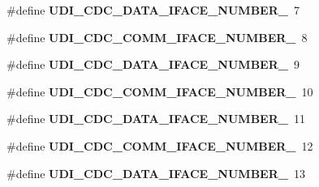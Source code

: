\begin{DoxyCompactItemize}
\item 
\hypertarget{group__udi__cdc__group__single__desc_ga025950aeedd93d7d00cc1754be5cf183}{\#define {\bfseries U\-D\-I\-\_\-\-C\-D\-C\-\_\-\-D\-A\-T\-A\-\_\-\-I\-F\-A\-C\-E\-\_\-\-N\-U\-M\-B\-E\-R\-\_}~7}\label{group__udi__cdc__group__single__desc_ga025950aeedd93d7d00cc1754be5cf183}

\item 
\hypertarget{group__udi__cdc__group__single__desc_ga8e135589db6eac98726ce02518bd2340}{\#define {\bfseries U\-D\-I\-\_\-\-C\-D\-C\-\_\-\-C\-O\-M\-M\-\_\-\-I\-F\-A\-C\-E\-\_\-\-N\-U\-M\-B\-E\-R\-\_}~8}\label{group__udi__cdc__group__single__desc_ga8e135589db6eac98726ce02518bd2340}

\item 
\hypertarget{group__udi__cdc__group__single__desc_ga0c3771d822965dddc9eef292f39ff347}{\#define {\bfseries U\-D\-I\-\_\-\-C\-D\-C\-\_\-\-D\-A\-T\-A\-\_\-\-I\-F\-A\-C\-E\-\_\-\-N\-U\-M\-B\-E\-R\-\_}~9}\label{group__udi__cdc__group__single__desc_ga0c3771d822965dddc9eef292f39ff347}

\item 
\hypertarget{group__udi__cdc__group__single__desc_ga040c811af32af103f96af72f55922259}{\#define {\bfseries U\-D\-I\-\_\-\-C\-D\-C\-\_\-\-C\-O\-M\-M\-\_\-\-I\-F\-A\-C\-E\-\_\-\-N\-U\-M\-B\-E\-R\-\_}~10}\label{group__udi__cdc__group__single__desc_ga040c811af32af103f96af72f55922259}

\item 
\hypertarget{group__udi__cdc__group__single__desc_gac99be51d82291d00c0188a6d05a6cc02}{\#define {\bfseries U\-D\-I\-\_\-\-C\-D\-C\-\_\-\-D\-A\-T\-A\-\_\-\-I\-F\-A\-C\-E\-\_\-\-N\-U\-M\-B\-E\-R\-\_}~11}\label{group__udi__cdc__group__single__desc_gac99be51d82291d00c0188a6d05a6cc02}

\item 
\hypertarget{group__udi__cdc__group__single__desc_ga7a7487e51450e9923a2ea3bf884a3039}{\#define {\bfseries U\-D\-I\-\_\-\-C\-D\-C\-\_\-\-C\-O\-M\-M\-\_\-\-I\-F\-A\-C\-E\-\_\-\-N\-U\-M\-B\-E\-R\-\_}~12}\label{group__udi__cdc__group__single__desc_ga7a7487e51450e9923a2ea3bf884a3039}

\item 
\hypertarget{group__udi__cdc__group__single__desc_ga0d859a246f282ed4f61692066d9a9a9d}{\#define {\bfseries U\-D\-I\-\_\-\-C\-D\-C\-\_\-\-D\-A\-T\-A\-\_\-\-I\-F\-A\-C\-E\-\_\-\-N\-U\-M\-B\-E\-R\-\_}~13}\label{group__udi__cdc__group__single__desc_ga0d859a246f282ed4f61692066d9a9a9d}

\end{DoxyCompactItemize}
